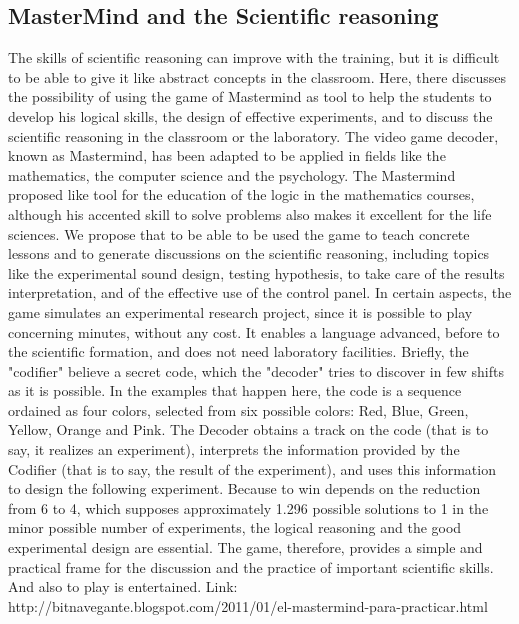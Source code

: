 \documentclass[12pt,letterpaper]{article}
\begin{document}
\subsection{MasterMind and the Scientific reasoning}
\begin{raggedleft}
The skills of scientific reasoning can improve with the training, but it is difficult to be able to give it like abstract concepts in the classroom. Here, there discusses the possibility of using the game of Mastermind as tool to help the students to develop his logical skills, the design of effective experiments, and to discuss the scientific reasoning in the classroom or the laboratory.\newline\newline
The video game decoder, known as Mastermind, has been adapted to be applied in fields like the mathematics, the computer science and the psychology. The Mastermind proposed like tool for the education of the logic in the mathematics courses, although his accented skill to solve problems also makes it excellent for the life sciences. We propose that to be able to be used the game to teach concrete lessons and to generate discussions on the scientific reasoning, including topics like the experimental sound design, testing hypothesis, to take care of the results interpretation, and of the effective use of the control panel.\newline\newline
In certain aspects, the game simulates an experimental research project, since it is possible to play concerning minutes, without any cost. It enables a language advanced, before to the scientific formation, and does not need laboratory facilities.\newline\newline
Briefly, the "codifier" believe a secret code, which the "decoder" tries to discover in few shifts as it is possible. In the examples that happen here, the code is a sequence ordained as four colors, selected from six possible colors: Red, Blue, Green, Yellow, Orange and Pink.\newline
The Decoder obtains a track on the code (that is to say, it realizes an experiment), interprets the information provided by the Codifier (that is to say, the result of the experiment), and uses this information to design the following experiment. Because to win depends on the reduction from 6 to 4, which supposes approximately 1.296 possible solutions to 1 in the minor possible number of experiments, the logical reasoning and the good experimental design are essential. The game, therefore, provides a simple and practical frame for the discussion and the practice of important scientific skills. And also to play is entertained. 
\newline\newline
Link: http://bitnavegante.blogspot.com/2011/01/el-mastermind-para-practicar.html
\end{raggedleft}
\end{document}
